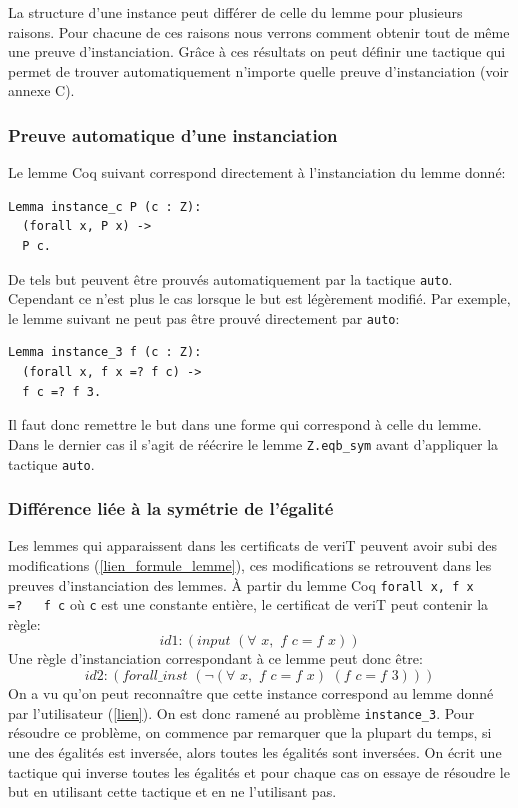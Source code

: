 \documentclass[11pt]{article}
\begin{document}
La structure d'une instance peut différer de celle du lemme pour plusieurs raisons. Pour chacune de ces raisons nous verrons comment obtenir tout de même une preuve d'instanciation. Grâce à ces résultats on peut définir une tactique qui permet de trouver automatiquement n'importe quelle preuve d'instanciation (voir annexe C).

\subsubsection{Preuve automatique d'une instanciation} \label{preuve_auto}

Le lemme Coq suivant correspond directement à l'instanciation du lemme donné:
\begin{lstlisting}[frame=single]
Lemma instance_c P (c : Z): 
  (forall x, P x) ->
  P c.
\end{lstlisting}

De tels but peuvent être prouvés automatiquement par la tactique \texttt{auto}. Cependant ce n'est plus le cas lorsque le but est légèrement modifié. Par exemple, le lemme suivant ne peut pas être prouvé directement par \texttt{auto}:

\begin{lstlisting}[frame=single]
Lemma instance_3 f (c : Z): 
  (forall x, f x =? f c) ->
  f c =? f 3.
\end{lstlisting}
Il faut donc remettre le but dans une forme qui correspond à celle du lemme. Dans le dernier cas il s'agit de réécrire le lemme \texttt{Z.eqb\_sym} avant d'appliquer la tactique \texttt{auto}.

\subsubsection{Différence liée à la symétrie de l'égalité}

Les lemmes qui apparaissent dans les certificats de veriT peuvent avoir subi des modifications (\ref{lien_formule_lemme}), ces modifications se retrouvent dans les preuves d'instanciation des lemmes. À partir du lemme Coq \texttt{forall\,x, f x =?\,\,\,f c} où \texttt{c} est une constante entière, le certificat de veriT peut contenir la règle:
\[id1: (input \,\,(\forall\,\, x, \,\,f \,\,c = f \,\,x))\]
Une règle d'instanciation correspondant à ce lemme peut donc être: 
\[id2:(forall\_inst\,\, (\neg (\forall \,\,x,\,\, f\,\, c = f \,\,x) \,\, (f\,\, c = f\,\, 3)))\]
On a vu qu'on peut reconnaître que cette instance correspond au lemme donné par l'utilisateur (\ref{lien}). On est donc ramené au problème \texttt{instance\_3}. Pour résoudre ce problème, on commence par remarquer que la plupart du temps, si une des égalités est inversée, alors toutes les égalités sont inversées. On écrit une tactique qui inverse toutes les égalités et pour chaque cas on essaye de résoudre le but en utilisant cette tactique et en ne l'utilisant pas.
\end{document}
